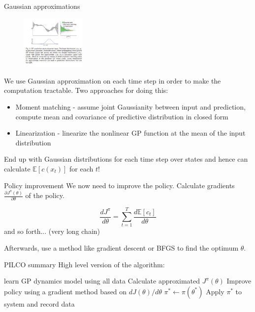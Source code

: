 \documentclass{beamer}
\begin{document}
\begin{frame}{Gaussian approximations}
	\begin{figure}[h]
		\includegraphics[width=120px]{./approx.png}
	\end{figure}
	We use Gaussian approximation on each time step in order to make the computation tractable. Two approaches for doing this:
	
	\begin{itemize}
		\item Moment matching - assume joint Gaussianity between input and prediction, compute mean and covariance of predictive distribution in closed form
		\item Linearization - linearize the nonlinear GP function at the mean of the input distribution
	\end{itemize}
	
	End up with Gaussian distributions for each time step over states and hence can calculate $\mathbb{E}[c(x_t)]$ for each $t$!
\end{frame}
\begin{frame}{Policy improvement}
	We now need to improve the policy. Calculate gradients $\frac{\partial J^{\pi}(\theta)}{\partial \theta}$ of the policy.
	
	$$ \frac{d J^{\pi}}{d \theta} = \sum_{t=1}^{T} \frac{d \mathbb{E}[c_t] }{d \theta} $$ and so forth... (very long chain)
	
	Afterwards, use a method like gradient descent or BFGS to find the optimum $\theta$.
\end{frame}
\begin{frame}{PILCO summary}
	High level version of the algorithm:
	\begin{algorithm}[H]
	\begin{algorithmic}[1]
		\Repeat
			\State learn GP dynamics model using all data
			\Repeat
				\State Calculate approximated $J^\pi (\theta)$
				\State Improve policy using a gradient method based on $dJ(\theta) / d \theta$
			\State $\pi^{*} \gets \pi(\theta^{*})$
			\State Apply $\pi^{*}$ to system and record data
		\EndProcedure
		\end{algorithmic}
	\end{algorithm}
\end{frame}
\end{document}
